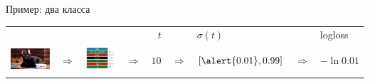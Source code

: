 \documentclass[notes,12pt, aspectratio=169]{beamer}
\begin{document}
\begin{frame}{Пример: два класса}
\begin{tabular}{m{2.5cm} m{0.35cm} m{1.8cm} m{0.35cm} m{0.5cm} m{0.35cm} m{2cm}  m{0.5cm} m{3.2cm}} 
	& & & &  {\large  $\mbox{ }t$ } &  &  {\large \hspace{8pt} $\sigma(t)$} &  &  {\large logloss} \\
	\includegraphics[scale=0.2]{tab_cat.png} & {\Large $\Rightarrow$} & \includegraphics[scale=0.2]{tab_nn.png}  &  {\Large $\Rightarrow$} &  $10$ &  {\Large $\Rightarrow$} &  $[\alert{0.01}, 0.99]$ & {\Large $\Rightarrow$}  & $-\ln 0.01$ \\
	

\end{tabular}
\end{frame}
\end{document}
